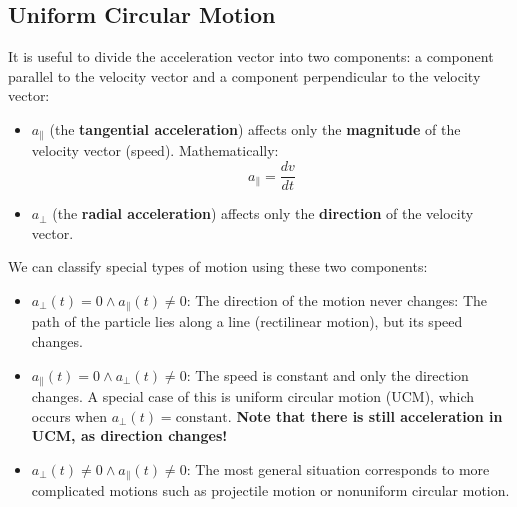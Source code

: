 \documentclass[article, 11pt]{article}
\theoremstyle{definition}
\begin{document}
    \subsection{Uniform Circular Motion}
    It is useful to divide the acceleration vector into two components: a component parallel to the velocity vector and a component perpendicular to the velocity vector:
    \begin{itemize}
        \item $a_\parallel$ (the \textbf{tangential acceleration}) affects only the \textbf{magnitude} of the velocity vector (speed). Mathematically:
        \begin{equation}
            a_\parallel = \frac{dv}{dt}
        \end{equation}
        \item $a_\perp$ (the \textbf{radial acceleration}) affects only the \textbf{direction} of the velocity vector.
    \end{itemize}
    We can classify special types of motion using these two components:
    \begin{itemize}
        \item $a_\perp(t) = 0 \land a_\parallel(t) \neq 0$: The direction of the motion never changes: The path of the particle lies along a line (rectilinear motion), but its speed changes.
        \item $a_\parallel(t) = 0 \land a_\perp(t) \neq 0$: The speed is constant and only the direction changes. A special case of this is uniform circular motion (UCM), which occurs when $a_\perp(t) = \text{constant}$. \textbf{Note that there is still acceleration in UCM, as direction changes!}
        \item $a_\perp(t) \neq 0 \land a_\parallel(t) \neq 0$: The most general situation corresponds to more complicated motions such as projectile motion or nonuniform circular motion. 
    \end{itemize}
\end{document}

